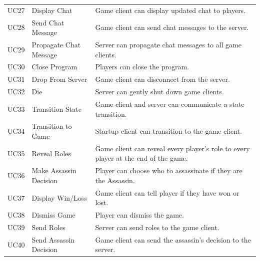 \documentclass{hitec}
\begin{document}
\begin{longtable}{l|l| p{6cm}}
UC27          & Display Chat                  & Game client can display updated chat to players.                                                         \\
UC28          & Send Chat Message             & Game client can send chat messages to the server.                                                        \\
UC29          & Propagate Chat Message        & Server can propagate chat messages to all game clients.                                                  \\
UC30          & Close Program                 & Players can close the program.                                                                           \\
UC31          & Drop From Server              & Game client can disconnect from the server.                                                              \\
UC32          & Die                           & Server can gently shut down game clients.                                                                \\
UC33          & Transition State              & Game client and server can communicate a state transition.                                               \\
UC34          & Transition to Game            & Startup client can transition to the game client.                                                        \\
UC35          & Reveal Roles                  & Game client can reveal every player's role to every player at the end of the game.                       \\
UC36          & Make Assassin Decision        & Player can choose who to assassinate if they are the Assassin.                                           \\
UC37          & Display Win/Loss              & Game client can tell player if they have won or lost.                                                    \\
UC38          & Dismiss Game                  & Player can dismiss the game.                                                                             \\
UC39          & Send Roles                    & Server can send roles to the game client.                                                                \\
UC40          & Send Assassin Decision        & Game client can send the assassin's decision to the server.                                              \\

\end{longtable}
\end{document}
